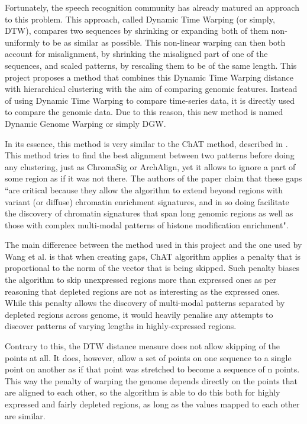 \documentclass[parskip]{cs4rep}
\begin{document}
Fortunately, the speech recognition community has already matured an approach to this problem. This approach, called Dynamic Time Warping (or simply, DTW), compares two sequences by shrinking or expanding both of them non-uniformly to be as similar as possible. This non-linear warping can then both account for misalignment, by shrinking the misaligned part of one of the sequences, and scaled patterns, by rescaling them to be of the same length. This project proposes a method that combines this Dynamic Time Warping distance with hierarchical clustering with the aim of comparing genomic features. Instead of using Dynamic Time Warping to compare time-series data, it is directly used to compare the genomic data. Due to this reason, this new method is named Dynamic Genome Warping or simply DGW.

In its essence, this method is very similar to the ChAT method, described in \citep{Wang:2012cb}.
This method tries to find the best alignment between two patterns before doing any clustering, just as ChromaSig or ArchAlign, yet it allows to ignore a part of some region as if it was not there. The authors of the paper claim that these gaps ``are critical because they allow the algorithm to extend beyond regions with variant (or diffuse) chromatin enrichment signatures, and in so doing facilitate the discovery of chromatin signatures that span long genomic regions as well as those with complex multi-modal patterns of histone modification enrichment". 

The main difference between the method used in this project and the one used by Wang et al. is that when creating gaps, ChAT algorithm applies a penalty that is proportional to the norm of the vector that is being skipped. Such penalty biases the algorithm to skip unexpressed regions more than expressed ones as per reasoning that depleted regions are not as interesting as the expressed ones. 
While this penalty allows the discovery of multi-modal patterns separated by depleted regions across genome, it would heavily penalise any attempts to discover patterns of varying lengths in highly-expressed regions.

Contrary to this, the DTW distance measure does not allow skipping of the points at all. It does, however, allow a set of points on one sequence to a single point on another as if that point was stretched to become a sequence of n points. This way the penalty of warping the genome depends directly on the points that are aligned to each other, so the algorithm is able to do this both for highly expressed and fairly depleted regions, as long as the values mapped to each other are similar.
\end{document}

